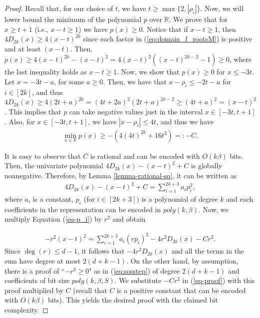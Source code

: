 \documentclass[11pt]{article}
\begin{document}
\begin{proof}
Recall that, for  our choice of $t$,  we have $t\geq \max\{2,|\rho_i|\}$. Now, we will lower bound the minimum of the polynomial $p$ over $\mathbb{R}$. We prove that for $x\geq t +1$ (i.e., $x-t \geq 1$) we have $p(x) \geq 0$. Notice that if $x-t \geq 1$, then $4D_{2k}(x) \geq 4(x-t)^{2k}$ since each factor in (\ref{eq:domain_f_rootsM}) is positive and at least $(x-t)$. Then, $p(x)\geq 4(x-t)^{2k}-(x-t)^2 = 4(x-t)^2((x-t)^{2k-2}-1)\geq 0$, where the last inequality holds as $x-t \geq 1$. Now, we show that $p(x)\geq 0$ for $x\leq -3t$. Let $x=-3t-a$, for some $a\geq 0$. Then, we have that $x-\rho_i\leq-2t-a$ for $i\in [2k]$, and thus $4D_{2k}(x)\geq 4(2t+a)^{2k} = (4t+2a)^2(2t+a)^{2k-2}\geq (4t+a)^2 = (x-t)^2$. This implies that $p$ can take negative values just in the interval $x\in [-3t, t+1]$. Also, for $x\in [-3t, t+1]$, we have $|x-\rho_i|\leq 4t$, and thus we have
\begin{align} 
\min_{x\in \mathbb{R}} p(x) \geq - (4(4t)^{2k} + 16t^2)=:-C.
\end{align}

It is easy to observe that $C$ is rational and can be encoded with $O(k\beta)$ bits. Then, the univariate polynomial $4D_{2k}(x) - (x-t)^2 + C$ is globally nonnegative. Therefore, by Lemma \ref{lemma-rational-sq}, it can be written as 
\begin{align}\label{eq-p_i}
    4D_{2k}(x) - (x-t)^2 + C = \sum_{i=1}^{2k+3}a_ip_i^2,
\end{align}
where $a_i$ is a constant, $p_i$ (for $i\in [2k+3])$ is a polynomial of degree $k$ and each coefficients in the representation can be encoded in $poly(k,\beta)$. Now, we multiply Equation (\ref{eq-p_i}) by $r^2$ and obtain 

\begin{align}\label{eq-proof}
    - r^2(x-t)^2 = \sum_{i=1}^{2k+3}a_i(rp_i)^2 -  4r^2 D_{2k}(x) -Cr^2.
\end{align}
Since $\deg(r) \leq d-1$, it follows that $-4r^2 D_{2k}(x)$ and all the terms in the sum have degree at most $2(d+k-1)$. On the other hand, by assumption, there is a proof of ``$-r^2\geq 0$" as in (\ref{eq:sosstep}) of degree $2(d+k-1)$ and coefficients of bit size $poly(k,\beta,S)$.  We substitute $-Cr^2$ in (\ref{eq-proof}) with this proof multiplied by $C$ (recall that $C$ is a positive constant that can be encoded with $O(k\beta)$ bits). This yields the desired proof with the claimed bit complexity.
\end{proof}
\end{document}
